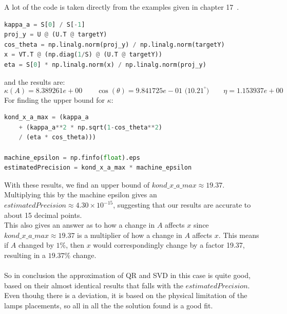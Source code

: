 \documentclass[12pt]{article}
\begin{document}
A lot of the code is taken directly from the examples given in chapter 17~\cite{NUMLA}.\\
\begin{lstlisting}[language=Python]
kappa_a = S[0] / S[-1] 
proj_y = U @ (U.T @ targetY)
cos_theta = np.linalg.norm(proj_y) / np.linalg.norm(targetY)
x = VT.T @ (np.diag(1/S) @ (U.T @ targetY))
eta = S[0] * np.linalg.norm(x) / np.linalg.norm(proj_y)
\end{lstlisting}
and the results are:
\[
\kappa(A) = 8.389261e+00 \qquad \cos(\theta) = 9.841725e-01 \text{ (10.21}^\circ) \qquad \eta = 1.153937e+00
\]
For finding the upper bound for $\kappa$:
\begin{lstlisting}[language=Python]
kond_x_a_max = (kappa_a
    + (kappa_a**2 * np.sqrt(1-cos_theta**2)
    / (eta * cos_theta)))

machine_epsilon = np.finfo(float).eps
estimatedPrecision = kond_x_a_max * machine_epsilon
\end{lstlisting}
With these results, we find an upper bound of $kond\_x\_a\_max \approx 19.37$. Multiplying this by the machine epsilon gives an $estimatedPrecision \approx 4.30 \times 10^{-15}$, suggesting that our results are accurate to about 15 decimal points.\\
This also gives an answer as to how a change in $A$ affects $x$ since $kond\_x\_a\_max \approx 19.37$ is a multiplier of how a change in $A$ affects $x$. This means if $A$ changed by $1\%$, then $x$ would correspondingly change by a factor 19.37, resulting in a $19.37\%$ change.\\\\

So in conclusion the approximation of QR and SVD in this case is quite good, based on their almost identical results that falls with the $estimatedPrecision$.  Even thouhg there is a deviation, it is based on the physical limitation of the lamps placements, so all in all the the solution found is a good fit.

\printbibliography

\end{document}
